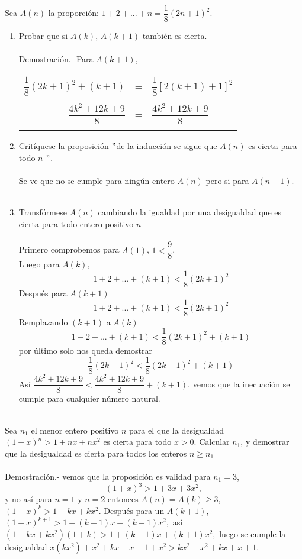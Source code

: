 \begin{teo}
Sea $A(n)$ la proporción: $1+2+...+n=\dfrac{1}{8} (2n+1)^2$.
\begin{enumerate}[\bfseries a)]
\item Probar que si $A(k)$, $A(k+1)$ también es cierta.\\\\
Demostración.- \; Para $A(k+1)$, 
\begin{center}
\begin{tabular}{r c l}
$\dfrac{1}{8}(2k+1)^2+(k+1)$&=&$\dfrac{1}{8}\left[2(k+1)+1\right]^2$\\\\
$\dfrac{4k^2+12k+9}{8}$&=&$\dfrac{4k^2+12k+9}{8}$\\\\
\end{tabular}
\end{center}
\item Critíquese la proposición $"$de la inducción se sigue que $A(n)$ es cierta para todo $n$ $"$.\\\\
Se ve que no se cumple para ningún entero $A(n)$ pero si para $A(n+1)$.\\\\ 
\item Transfórmese $A(n)$ cambiando la igualdad por una desigualdad que es cierta para todo entero positivo $n$\\\\
Primero comprobemos para $A(1)$, \; $1<\dfrac{9}{8}$.\\
Luego para $A(k),$ $$1+2+...+(k+1)<\dfrac{1}{8}(2k+1)^2$$
Después para $A(k+1)$ $$1+2+...+(k+1)<\dfrac{1}{8}(2k+1)^2$$
Remplazando $(k+1)$ a $A(k)$ $$1+2+...+(k+1)<\dfrac{1}{8}(2k+1)^2+(k+1)$$
por último solo nos queda demostrar $$\dfrac{1}{8}(2k+1)^2<\dfrac{1}{8}(2k+1)^2+(k+1)$$
Así $\dfrac{4k^2+12k+9}{8}<\dfrac{4k^2+12k+9}{8} +(k+1)$, vemos que la inecuación se cumple para cualquier número natural.\\\\ 
\end{enumerate} 
\end{teo}

\begin{teo}
Sea $n_1$ el menor entero positivo $n$ para el que la desigualdad $(1+x)^n>1+nx+nx^2$ es cierta para todo $x>0$. Calcular $n_1$, y demostrar que la desigualdad es cierta para todos los enteros $n\geq n_1$\\\\
Demostración.- \; vemos que la proposición es validad para $n_1=3$, $$(1+x)^3>1+3x+3x^2,$$ y no así para $n=1$ \; y \;$n=2$ entonces $A(n)=A(k)\geq 3$, $(1+x)^k>1+kx+kx^2.$ Después para un $A(k+1)$, $(1+x)^{k+1}>1+(k+1)x+(k+1)x^2,$ así \; $(1+kx+kx^2)(1+k)>1+(k+1)x+(k+1)x^2,$ luego se cumple la desigualdad $x(kx^2)+x^2+kx+x+1+x^2>kx^2+x^2+kx+x+1$.\\\\
\end{teo}

